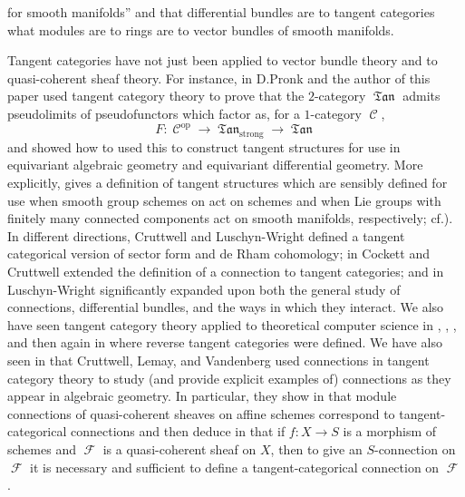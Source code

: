 \documentclass{amsart}
\theoremstyle{definition}
\DeclareMathOperator{\Cscr}{\mathscr{C}}
\DeclareMathOperator{\Fscr}{\mathscr{F}}
\DeclareMathOperator{\fTan}{\mathfrak{Tan}}
\DeclareMathOperator{\SMan}{\mathbf{SMan}}
\DeclareMathOperator{\op}{op}
\numberwithin{equation}{subsection}
\begin{document}
for smooth manifolds'' and that differential bundles are to tangent categories what modules are to rings are to vector bundles of smooth manifolds. 

Tangent categories have not just been applied to vector bundle theory and to quasi-coherent sheaf theory. For instance, in \cite{DoretteMe} D.\@ Pronk and the author of this paper used tangent category theory to prove that the $2$-category $\fTan$ admits pseudolimits of pseudofunctors which factor as, for a $1$-category $\Cscr$,
\[
F:\Cscr^{\op} \to \fTan_{\operatorname{strong}} \to \fTan
\] 
and showed how to used this to construct tangent structures for use in equivariant algebraic geometry and equivariant differential geometry. More explicitly, \cite{DoretteMe} gives a definition of tangent structures which are sensibly defined for use when smooth group schemes on act on schemes and when Lie groups with finitely many connected components act  on smooth manifolds, respectively; cf.\@ \cite[Sections 5 -- 8]{DoretteMe}). In different directions, \cite{GeoffRory} Cruttwell and Luschyn-Wright defined a tangent categorical version of sector form and de Rham cohomology; in \cite{GeoffRobinConnections} Cockett and Cruttwell extended the definition of a connection to tangent categories; and in \cite{RoryConnectionsTanCAts} Luschyn-Wright significantly expanded upon  both the general study of connections, differential bundles, and the ways in which they interact. We also have seen tangent category theory applied to theoretical computer science in \cite{JonathanThesis}, \cite{GeoffJonBenACT2019}, \cite{ReverseDeriv}, and then again in \cite{GeoffJSReverse} where reverse tangent categories were defined. We have also seen in \cite{GeoffJSElias} that Cruttwell, Lemay, and Vandenberg used connections in tangent category theory to study (and provide explicit examples of) connections as they appear in algebraic geometry. In particular, they show in \cite[Theorem 8]{GeoffJSElias} that module connections of quasi-coherent sheaves on affine schemes correspond to tangent-categorical connections and then deduce in \cite[Corollary 4.11]{GeoffJSElias} that if $f:X \to S$ is a morphism of schemes and $\Fscr$ is a quasi-coherent sheaf on $X$, then to give an $S$-connection on $\Fscr$ it is necessary and sufficient to define a tangent-categorical connection on $\Fscr$.
\end{document}

